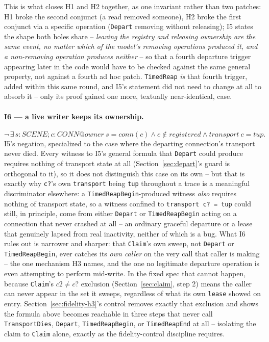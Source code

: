 \documentclass[a4paper,10pt,fleqn]{article}
\begin{document}
This is what closes H1 and H2 together, as one invariant rather than two
patches: H1 broke the second conjunct (a read removed someone), H2 broke
the first conjunct via a specific operation (\texttt{Depart} removing
without releasing); I5 states the shape both holes share -- \emph{leaving
the registry and releasing ownership are the same event, no matter which
of the model's removing operations produced it, and a non-removing
operation produces neither} -- so that a fourth departure trigger
appearing later in the code would have to be checked against the same
general property, not against a fourth ad hoc patch. \texttt{TimedReap}
\emph{is} that fourth trigger, added within this same round, and I5's
statement did not need to change at all to absorb it -- only its proof
gained one more, textually near-identical, case.

\paragraph{I6 --- a live writer keeps its ownership.}
\[
  \lnot\, \exists\, s : SCENE; c : CONN @
    owner~s = conn(c) \land c \notin registered \land transport~c = tup.
\]
I5's negation, specialized to the case where the departing connection's
transport never died. Every witness to I5's general formula that
\texttt{Depart} could produce requires nothing of transport state at all
(Section~\ref{sec:depart}'s guard is orthogonal to it), so it does not
distinguish this case on its own -- but that is exactly why \texttt{c?}'s
own \texttt{transport} being \texttt{tup} throughout a trace is a
meaningful discriminator elsewhere: a \texttt{TimedReapBegin}-produced
witness \emph{also} requires nothing of transport state, so a witness
confined to \texttt{transport~c? = tup} could still, in principle, come
from either \texttt{Depart} or \texttt{TimedReapBegin} acting on a
connection that never crashed at all -- an ordinary graceful departure or
a lease that genuinely lapsed from real inactivity, neither of which is a
bug. What I6 rules out is narrower and sharper: that \texttt{Claim}'s own
sweep, not \texttt{Depart} or \texttt{TimedReapBegin}, ever catches its
\emph{own caller} on the very call that caller is making -- the one
mechanism H3 names, and the one no legitimate departure operation is even
attempting to perform mid-write. In the fixed spec that cannot happen,
because \texttt{Claim}'s \(c2 \neq c?\) exclusion (Section~\ref{sec:claim},
step 2) means the caller can never appear in the set it sweeps, regardless
of what its own \texttt{lease} showed on entry. Section~\ref{sec:fidelity-h3}'s
control removes exactly that exclusion and shows the formula above becomes
reachable in three steps that never call \texttt{TransportDies},
\texttt{Depart}, \texttt{TimedReapBegin}, or \texttt{TimedReapEnd} at all --
isolating the claim to \texttt{Claim} alone, exactly as the
fidelity-control discipline requires.
\end{document}
